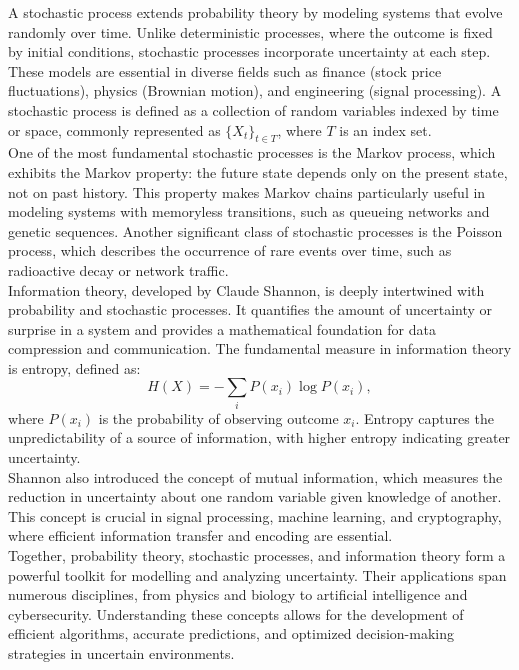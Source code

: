 \documentclass{book}
\begin{document}
A stochastic process extends probability theory by modeling systems that evolve randomly over time. Unlike deterministic processes, where the outcome is fixed by initial conditions, stochastic processes incorporate uncertainty at each step. These models are essential in diverse fields such as finance (stock price fluctuations), physics (Brownian motion), and engineering (signal processing). A stochastic process is defined as a collection of random variables indexed by time or space, commonly represented as $\{X_t\}_{t \in T}$, where $T$ is an index set.\\

One of the most fundamental stochastic processes is the Markov process, which exhibits the Markov property: the future state depends only on the present state, not on past history. This property makes Markov chains particularly useful in modeling systems with memoryless transitions, such as queueing networks and genetic sequences. Another significant class of stochastic processes is the Poisson process, which describes the occurrence of rare events over time, such as radioactive decay or network traffic.\\

Information theory, developed by Claude Shannon, is deeply intertwined with probability and stochastic processes. It quantifies the amount of uncertainty or surprise in a system and provides a mathematical foundation for data compression and communication. The fundamental measure in information theory is entropy, defined as:
\begin{equation}
    H(X) = -\sum_{i} P(x_i) \log P(x_i),
\end{equation}
where $P(x_i)$ is the probability of observing outcome $x_i$. Entropy captures the unpredictability of a source of information, with higher entropy indicating greater uncertainty.\\

Shannon also introduced the concept of mutual information, which measures the reduction in uncertainty about one random variable given knowledge of another. This concept is crucial in signal processing, machine learning, and cryptography, where efficient information transfer and encoding are essential.\\

Together, probability theory, stochastic processes, and information theory form a powerful toolkit for modelling and analyzing uncertainty. Their applications span numerous disciplines, from physics and biology to artificial intelligence and cybersecurity. Understanding these concepts allows for the development of efficient algorithms, accurate predictions, and optimized decision-making strategies in uncertain environments.
\end{document}

